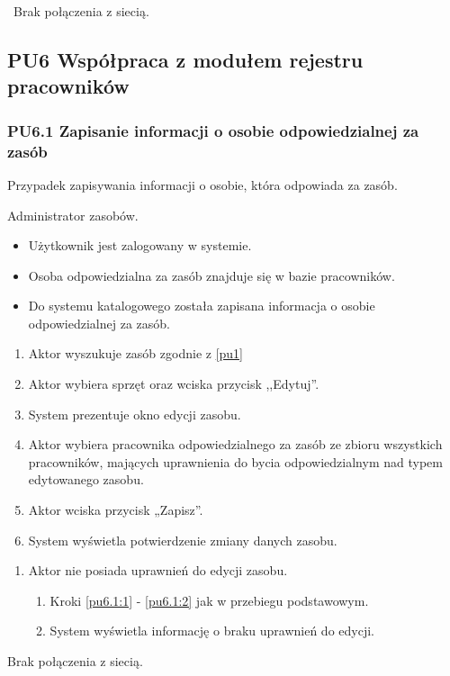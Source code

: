 \
Brak połączenia z siecią.


\subsection{PU6 Współpraca z modułem rejestru pracowników} \label{pu6}
\subsubsection{PU6.1 Zapisanie informacji o osobie odpowiedzialnej za zasób}
\myparagraph{Opis}
Przypadek zapisywania informacji o osobie, która odpowiada za zasób.

Administrator zasobów.

\begin{itemize}
\item Użytkownik jest zalogowany w systemie.
\item Osoba odpowiedzialna za zasób znajduje się w bazie pracowników.
\end{itemize}

\begin{itemize}
\item Do systemu katalogowego została zapisana informacja o osobie odpowiedzialnej za zasób.
\end{itemize}

\begin{enumerate}
	\item \label{pu6.1:1} Aktor wyszukuje zasób zgodnie z \ref{pu1}
	\item \label{pu6.1:2} Aktor wybiera sprzęt oraz wciska przycisk ,,Edytuj''.
	\item System prezentuje okno edycji zasobu.
	\item Aktor wybiera pracownika odpowiedzialnego za zasób ze zbioru wszystkich pracowników, mających uprawnienia do bycia odpowiedzialnym nad typem edytowanego zasobu.
	\item Aktor wciska przycisk „Zapisz”.
	\item System wyświetla potwierdzenie zmiany danych zasobu.
\end{enumerate}

\begin{enumerate}
	\item Aktor nie posiada uprawnień do edycji zasobu.
	\begin{enumerate}[label*=\arabic*.]
		\item Kroki \ref{pu6.1:1} - \ref{pu6.1:2} jak w przebiegu podstawowym.
		\item System wyświetla informację o braku uprawnień do edycji.
	\end{enumerate}
\end{enumerate}
Brak połączenia z siecią.

